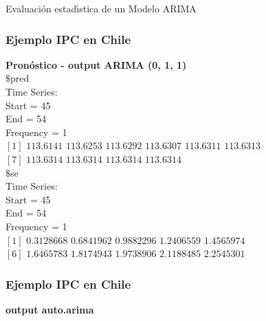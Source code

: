 \documentclass[spanish,xcolor=table]{beamer}
\begin{document}
\begin{section}{Evaluaci\'on estad\'{\i}stica de un Modelo ARIMA}
\begin{frame}
\frametitle{Ejemplo IPC en Chile}
\textbf{Pron\'ostico - output ARIMA (0, 1, 1) }\\
 \vspace{4mm}	
$\$$pred\\
Time Series:\\
Start = 45 \\
End = 54 \\
Frequency = 1 \\
$\left [ 1 \right ]$ $113.6141$ $113.6253$ $113.6292$ $113.6307$ $113.6311$ $113.6313$\\
$\left [ 7 \right ]$ $113.6314$ $113.6314$ $113.6314$ $113.6314$\\

$\$$se\\
Time Series:\\
Start = 45 \\
End = 54 \\
Frequency = 1 \\
$\left [ 1 \right ]$ $0.3128668$ $0.6841962$ $0.9882296$ $1.2406559$ $1.4565974$\\
$\left [ 6 \right ]$ $1.6465783$ $1.8174943$ $1.9738906$ $2.1188485$ $2.2545301$\\

\end{frame}

\begin{frame}
\frametitle{Ejemplo IPC en Chile}
\textbf{output auto.arima}\\


\end{frame}
\end{section}
\end{document}
